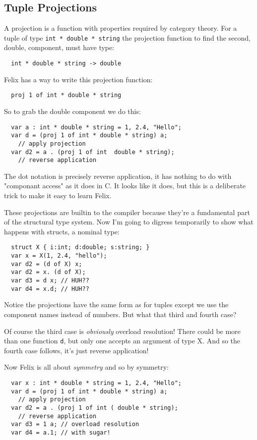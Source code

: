 \documentclass{article}
\begin{document}
\subsection{Tuple Projections}
A projection is a function with properties required by category theory.
For a tuple of type \verb$int * double * string$ the projection function 
to find the second, double, component, must have type:
\begin{verbatim}
  int * double * string -> double
\end{verbatim}
Felix has a way to write this projection function:
\begin{verbatim}
  proj 1 of int * double * string 
\end{verbatim}
So to grab the double component we do this:
\begin{verbatim}
  var a : int * double * string = 1, 2.4, "Hello";
  var d = (proj 1 of int * double * string) a; 
    // apply projection
  var d2 = a . (proj 1 of int  double * string); 
    // reverse application
\end{verbatim}
The dot notation is precisely reverse application, it has nothing to do
with "componant access" as it does in C. It looks like it does, but this
is a deliberate trick to make it easy to learn Felix.

These projections are builtin to the compiler because they're a fundamental
part of the structural type system. Now I'm going to digress temporarily
to show what happens with structs, a nominal type:
\begin{verbatim}
  struct X { i:int; d:double; s:string; }
  var x = X(1, 2.4, "hello"); 
  var d2 = (d of X) x;
  var d2 = x. (d of X);
  var d3 = d x; // HUH??
  var d4 = x.d; // HUH??
\end{verbatim}
Notice the projections have the same form as for tuples except we use the
component names instead of numbers. But what that third and fourth case?

Of course the third case is {\em obviously} overload resolution! There could
be more than one function \verb$d$, but only one accepts an argument of type X.
And so the fourth case follows, it's just reverse application!

Now Felix is all about {\em symmetry} and so by symmetry:

\begin{verbatim}
  var x : int * double * string = 1, 2.4, "Hello";
  var d = (proj 1 of int * double * string) a; 
    // apply projection
  var d2 = a . (proj 1 of int ( double * string);
    // reverse application
  var d3 = 1 a; // overload resolution 
  var d4 = a.1; // with sugar!
\end{verbatim}
\end{document}
